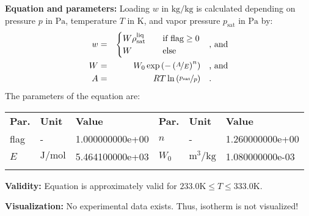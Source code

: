 \textbf{Equation and parameters:}
\newline
%
Loading $w$ in $\si{\kilogram\per\kilogram}$ is calculated depending on pressure $p$ in $\si{\pascal}$, temperature $T$ in $\si{\kelvin}$, and vapor pressure $p_\mathrm{sat}$ in $\si{\pascal}$ by:
%
\begin{equation*}
\begin{split}
w &=& \begin{cases} W \rho_\mathrm{sat}^{\mathrm{liq}} & \quad \text{if flag} \geq 0 \\ W & \quad \text{else} \end{cases} & \quad\text{, and} \\
W &=& W_0 \exp \left( - \left( \nicefrac{A}{E} \right) ^{n} \right) & \quad\text{, and} \\
A &=& R T \ln \left( \nicefrac{p_\mathrm{sat}}{p} \right) & \quad\text{.} \\
\end{split}
\end{equation*}
%
The parameters of the equation are:
%
\begin{longtable}[l]{lll|lll}
\toprule
\addlinespace
\textbf{Par.} & \textbf{Unit} & \textbf{Value} &	\textbf{Par.} & \textbf{Unit} & \textbf{Value} \\
\addlinespace
\midrule
\endhead

\bottomrule
\endfoot
\bottomrule
\endlastfoot
\addlinespace

flag & - & 1.000000000e+00 & $n$ & - & 1.260000000e+00 \\
$E$ & $\si{\joule\per\mole}$ & 5.464100000e+03 & $W_0$ & $\si{\cubic\meter\per\kilogram}$ & 1.080000000e-03 \\

\addlinespace\end{longtable}

\textbf{Validity:}
\newline
Equation is approximately valid for $233.0 \si{\kelvin} \leq T \leq 333.0 \si{\kelvin}$.
\newline

\textbf{Visualization:}
%
\newline
No experimental data exists. Thus, isotherm is not visualized!
%

\FloatBarrier
\newpage
